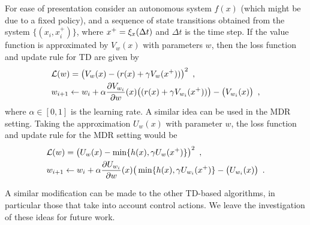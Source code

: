For ease of presentation consider an autonomous system $f(x)$ (which might be due to a fixed policy), and a sequence of state transitions obtained from the system $\{(x_i,x_i^+)\}$, where $x^+=\xi_x(\Delta t)$ and $\Delta t$ is the time step. If the value function is approximated by $V_w(x)$ with parameters $w$, then the loss function and update rule for TD are given by
%
\begin{equation}
\begin{split}
&\mathcal{L}(w)=\big(V_{w}(x) - (r(x)+\gamma V_{w}(x^+))\big)^2 \enspace,\\
&w_{i+1} \leftarrow w_i + \alpha\frac{\partial V_{w_i}}{\partial w}(x)\big((r(x)+\gamma V_{w_i}(x^+))\big)- \big(V_{w_i}(x)\big)\enspace,
\end{split}
\end{equation}%
\noindent where $\alpha \in [0,1]$ is the learning rate. A similar idea can be used in the MDR setting. Taking the approximation $U_w(x)$ with parameter $w$, the loss function and update rule for the MDR setting would be
%
\begin{equation}
\begin{split}
&\mathcal{L}(w)=\big(U_{w}(x) - \min\{h(x),\gamma U_{w}(x^+)\}\big)^2\enspace,\\
&w_{i+1} \leftarrow w_i + \alpha\frac{\partial U_{w_i}}{\partial w}(x)\big(\min\{h(x),\gamma U_{w_i}(x^+)\}- \big(U_{w_i}(x)\big)\enspace.
\end{split}
\end{equation}

A similar modification can be made to the other TD-based algorithms, in particular those that take into account control actions. We leave the investigation of these ideas for future work. 




